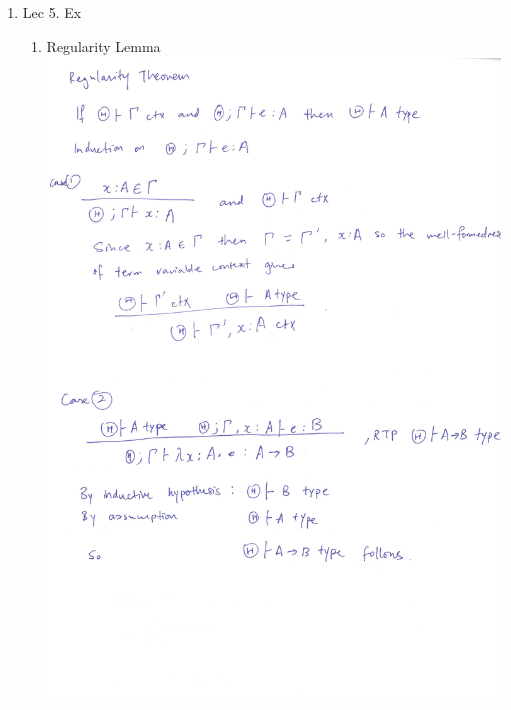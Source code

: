 \documentclass[10pt, a4paper]{article}
\begin{document}
\begin{enumerate}
\begin{enumerate}
\item 
Lec 5. Ex
\begin{enumerate}
	\item Regularity Lemma \\
	\includegraphics[width=\textwidth]{regularity1.jpg} \\

\end{enumerate}
\end{enumerate}
\end{enumerate}
\end{document}
